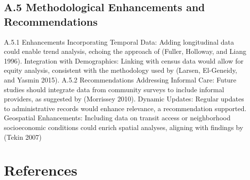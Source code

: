\documentclass[
  letterpaper,
  DIV=11,
  numbers=noendperiod]{scrartcl}
\begin{document}
\subsection{A.5 Methodological Enhancements and
Recommendations}\label{a.5-methodological-enhancements-and-recommendations}

A.5.1 Enhancements Incorporating Temporal Data: Adding longitudinal data
could enable trend analysis, echoing the approach of (Fuller, Holloway,
and Liang 1996). Integration with Demographics: Linking with census data
would allow for equity analysis, consistent with the methodology used by
(Larsen, El-Geneidy, and Yasmin 2015). A.5.2 Recommendations Addressing
Informal Care: Future studies should integrate data from community
surveys to include informal providers, as suggested by (Morrissey 2010).
Dynamic Updates: Regular updates to administrative records would enhance
relevance, a recommendation supported. Geospatial Enhancements:
Including data on transit access or neighborhood socioeconomic
conditions could enrich spatial analyses, aligning with findings by
(Tekin 2007)

\section*{References}\label{references}
\end{document}

